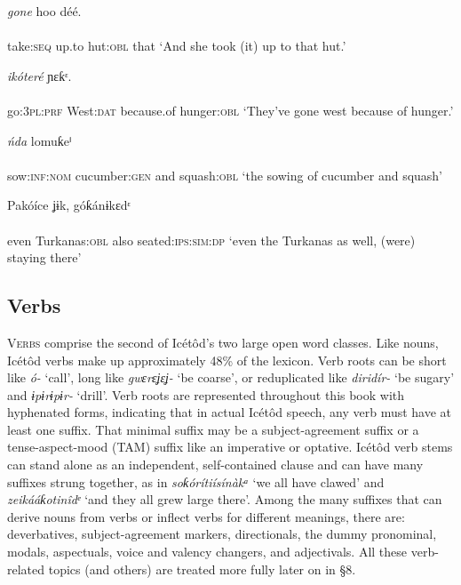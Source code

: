 \ea\label{ex:}
   \textit{gone}   hoo     déé. \\
    \\
take:\textsc{seq}   up.to   hut:\textsc{obl}   that
\glt ‘And she took (it) up to that hut.’ 
\z




\ea\label{ex:}
   \textit{ikóteré}   ɲɛƙᵋ. \\
    \\
go:\textsc{3pl:prf}   West:\textsc{dat}   because.of   hunger:\textsc{obl}
\glt ‘They’ve gone west because of hunger.’ 
\z




\ea\label{ex:}
       \textit{ńda}   lomuƙeⁱ \\
    \\
sow:\textsc{inf:nom}   cucumber:\textsc{gen}   and   squash:\textsc{obl}
\glt ‘the sowing of cucumber and squash’ 
\z




\ea\label{ex:}
   Pakóíce     ʝɨk,   góƙánɨkɛdᵋ \\
    \\
even  Turkanas:\textsc{obl}   also   seated:\textsc{ips:sim:dp}
\glt ‘even the Turkanas as well, (were) staying there’ 
\z






\subsection{Verbs}


\textsc{Verbs} comprise the second of Icétôd’s two large open word classes. Like nouns, Icétôd verbs make up approximately 48\% of the lexicon. Verb roots can be short like \textit{ó-} ‘call’, long like \textit{gwɛrɛʝɛʝ-} ‘be coarse’, or reduplicated like \textit{diridír-} ‘be sugary’ and \textit{ɨpɨrɨpɨr-} ‘drill’. Verb roots are represented throughout this book with hyphenated forms, indicating that in actual Icétôd speech, any verb must have at least one suffix. That minimal suffix may be a subject-agreement suffix or a tense-aspect-mood (TAM) suffix like an imperative or optative. Icétôd verb stems can stand alone as an independent, self-contained clause and can have many suffixes strung together, as in \textit{soƙórítiísínàkᵃ} ‘we all have clawed’ and \textit{zeikááƙotinîdᵉ} ‘and they all grew large there’. Among the many suffixes that can derive nouns from verbs or inflect verbs for different meanings, there are: deverbatives, subject-agreement markers, directionals, the dummy pronominal, modals, aspectuals, voice and valency changers, and adjectivals. All these verb-related topics (and others) are treated more fully later on in §8.




